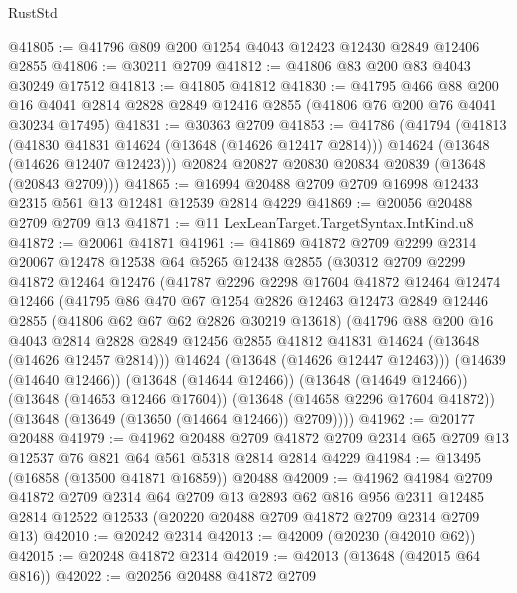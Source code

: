 \begin{lexlean}{RustStd}
\begin{coremodule}
@41805 := @41796 @809 @200 @1254 @4043 @12423 @12430 @2849 @12406 @2855
@41806 := @30211 @2709
@41812 := @41806 @83 @200 @83 @4043 @30249 @17512
@41813 := @41805 @41812
@41830 := @41795
    @466
    @88
    @200
    @16
    @4041
    @2814
    @2828
    @2849
    @12416
    @2855
    (@41806 @76 @200 @76 @4041 @30234 @17495)
@41831 := @30363 @2709
@41853 := @41786
    (@41794
      (@41813
        (@41830 @41831 @14624 (@13648 (@14626 @12417 @2814)))
        @14624
        (@13648 (@14626 @12407 @12423)))
      @20824
      @20827
      @20830
      @20834
      @20839
      (@13648 (@20843 @2709)))
@41865 := @16994 @20488 @2709 @2709 @16998 @12433 @2315 @561 @13 @12481 @12539 @2814 @4229
@41869 := @20056 @20488 @2709 @2709 @13
@41871 := @11 LexLeanTarget.TargetSyntax.IntKind.u8
@41872 := @20061 @41871
@41961 := @41869
    @41872
    @2709
    @2299
    @2314
    @20067
    @12478
    @12538
    @64
    @5265
    @12438
    @2855
    (@30312
      @2709
      @2299
      @41872
      @12464
      @12476
      (@41787
        @2296
        @2298
        @17604
        @41872
        @12464
        @12474
        @12466
        (@41795
          @86
          @470
          @67
          @1254
          @2826
          @12463
          @12473
          @2849
          @12446
          @2855
          (@41806 @62 @67 @62 @2826 @30219 @13618)
          (@41796
            @88
            @200
            @16
            @4043
            @2814
            @2828
            @2849
            @12456
            @2855
            @41812
            @41831
            @14624
            (@13648 (@14626 @12457 @2814)))
          @14624
          (@13648 (@14626 @12447 @12463)))
        (@14639 (@14640 @12466))
        (@13648 (@14644 @12466))
        (@13648 (@14649 @12466))
        (@13648 (@14653 @12466 @17604))
        (@13648 (@14658 @2296 @17604 @41872))
        (@13648 (@13649 (@13650 (@14664 @12466)) @2709))))
@41962 := @20177 @20488
@41979 := @41962
    @20488
    @2709
    @41872
    @2709
    @2314
    @65
    @2709
    @13
    @12537
    @76
    @821
    @64
    @561
    @5318
    @2814
    @2814
    @4229
@41984 := @13495 (@16858 (@13500 @41871 @16859)) @20488
@42009 := @41962
    @41984
    @2709
    @41872
    @2709
    @2314
    @64
    @2709
    @13
    @2893
    @62
    @816
    @956
    @2311
    @12485
    @2814
    @12522
    @12533
    (@20220 @20488 @2709 @41872 @2709 @2314 @2709 @13)
@42010 := @20242 @2314
@42013 := @42009 (@20230 (@42010 @62))
@42015 := @20248 @41872 @2314
@42019 := @42013 (@13648 (@42015 @64 @816))
@42022 := @20256 @20488 @41872 @2709

\end{coremodule}
\end{lexlean}
